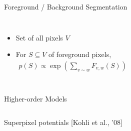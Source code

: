 \documentclass[mathserif]{beamer}
\newcommand{\qcite}[1]{{\scriptsize\color{col2}[#1]}}
\begin{document}
\begin{frame}{Foreground / Background Segmentation}
\begin{columns}[c]
{\vspace{1em}
\begin{itemize}
\item<5-> Set of all pixels $V$
\vspace{1em}
\item<6-> For $S \subseteq V$ of foreground pixels,
\begin{align*}
p(S) \propto \exp\left(\sum_{v \sim w} F_{v, w}(S)\right)
\end{align*}
\end{itemize}
}
\end{columns}
\end{frame}

\begin{frame}{Higher-order Models}
\vspace{0.5em}
\begin{columns}[c]
\centering
{}%

\vspace{0.5em}
\centering
{\small Superpixel potentials} \qcite{Kohli et al., '08}


\end{columns}
\end{frame}
\end{document}
